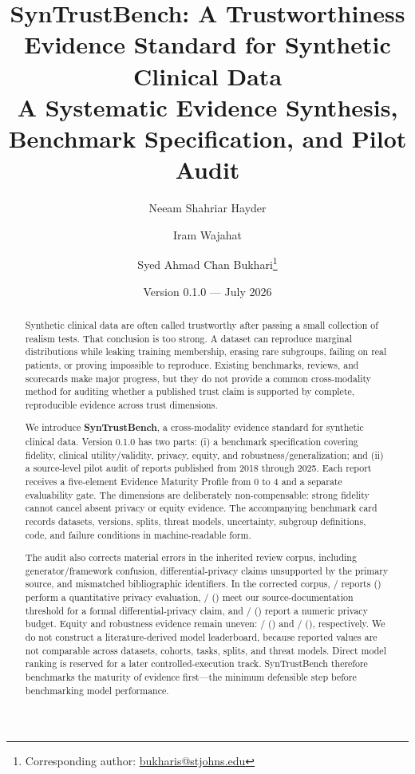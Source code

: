 \documentclass[11pt,letterpaper]{article}
\title{\textbf{SynTrustBench: A Trustworthiness Evidence Standard for Synthetic Clinical Data}\\
\large A Systematic Evidence Synthesis, Benchmark Specification, and Pilot Audit}
\author[1]{Neeam Shahriar Hayder}
\author[2]{Iram Wajahat}
\author[1]{Syed Ahmad Chan Bukhari\thanks{Corresponding author: \href{mailto:bukharis@stjohns.edu}{bukharis@stjohns.edu}}}
\affil[1]{Division of Computer Science, Mathematics and Science, St. John's University, New York, NY 11439, USA}
\affil[2]{College of Pharmacy and Health Sciences, St. John's University, New York, NY 11439, USA}
\date{Version 0.1.0 --- July 2026}
\begin{document}
\maketitle

\begin{abstract}
Synthetic clinical data are often called trustworthy after passing a small collection of realism tests. That conclusion is too strong. A dataset can reproduce marginal distributions while leaking training membership, erasing rare subgroups, failing on real patients, or proving impossible to reproduce. Existing benchmarks, reviews, and scorecards make major progress, but they do not provide a common cross-modality method for auditing whether a published trust claim is supported by complete, reproducible evidence across trust dimensions.

We introduce \textbf{SynTrustBench}, a cross-modality evidence standard for synthetic clinical data. Version 0.1.0 has two parts: (i) a benchmark specification covering fidelity, clinical utility/validity, privacy, equity, and robustness/generalization; and (ii) a source-level pilot audit of \CorpusN{} reports published from 2018 through 2025. Each report receives a five-element Evidence Maturity Profile from 0 to 4 and a separate evaluability gate. The dimensions are deliberately non-compensable: strong fidelity cannot cancel absent privacy or equity evidence. The accompanying benchmark card records datasets, versions, splits, threat models, uncertainty, subgroup definitions, code, and failure conditions in machine-readable form.

The audit also corrects material errors in the inherited review corpus, including generator/framework confusion, differential-privacy claims unsupported by the primary source, and mismatched bibliographic identifiers. In the corrected corpus, \PrivacyN{}/\CorpusN{} reports (\PrivacyNPct) perform a quantitative privacy evaluation, \FormalDPN{}/\CorpusN{} (\FormalDPNPct) meet our source-documentation threshold for a formal differential-privacy claim, and \EpsilonN{}/\CorpusN{} (\EpsilonNPct) report a numeric privacy budget. Equity and robustness evidence remain uneven: \FairnessN{}/\CorpusN{} (\FairnessNPct) and \RobustnessN{}/\CorpusN{} (\RobustnessNPct), respectively. We do not construct a literature-derived model leaderboard, because reported values are not comparable across datasets, cohorts, tasks, splits, and threat models. Direct model ranking is reserved for a later controlled-execution track. SynTrustBench therefore benchmarks the maturity of evidence first---the minimum defensible step before benchmarking model performance.
\end{abstract}
\end{document}

